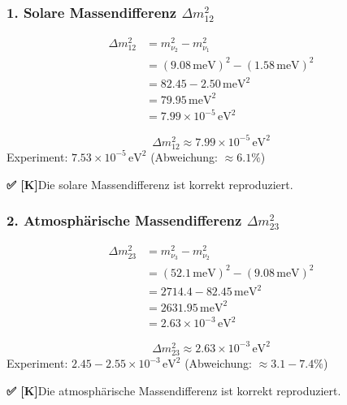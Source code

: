 \documentclass[11pt,a4paper]{article}
\newcommand{\Checkmark}{\textbf{✅ [K]}}
\begin{document}
	\subsubsection{1. Solare Massendifferenz $\Delta m_{12}^2$}
	
	\begin{align}
		\Delta m_{12}^2 &= m_{\nu_2}^2 - m_{\nu_1}^2 \\
		&= (9.08\,\text{meV})^2 - (1.58\,\text{meV})^2 \\
		&= 82.45 - 2.50 \,\text{meV}^2 \\
		&= 79.95 \,\text{meV}^2 \\
		&= 7.99 \times 10^{-5}\,\text{eV}^2
	\end{align}
	
	\begin{tcolorbox}[colback=green!5!white,colframe=green!50!black,title=Solare Massendifferenz -- GELÖST \Checkmark]
		\begin{equation}
			\Delta m_{12}^2 \approx 7.99 \times 10^{-5}\,\text{eV}^2
		\end{equation}
		Experiment: $7.53 \times 10^{-5}\,\text{eV}^2$ (Abweichung: $\approx 6.1\%$)
		
		\Checkmark Die solare Massendifferenz ist korrekt reproduziert.
	\end{tcolorbox}
	
	\subsubsection{2. Atmosphärische Massendifferenz $\Delta m_{23}^2$}
	
	\begin{align}
		\Delta m_{23}^2 &= m_{\nu_3}^2 - m_{\nu_2}^2 \\
		&= (52.1\,\text{meV})^2 - (9.08\,\text{meV})^2 \\
		&= 2714.4 - 82.45 \,\text{meV}^2 \\
		&= 2631.95 \,\text{meV}^2 \\
		&= 2.63 \times 10^{-3}\,\text{eV}^2
	\end{align}
	
	\begin{tcolorbox}[colback=green!5!white,colframe=green!50!black,title=Atmosphärische Massendifferenz -- GELÖST \Checkmark]
		\begin{equation}
			\Delta m_{23}^2 \approx 2.63 \times 10^{-3}\,\text{eV}^2
		\end{equation}
		Experiment: $2.45 - 2.55 \times 10^{-3}\,\text{eV}^2$ (Abweichung: $\approx 3.1 - 7.4\%$)
		
		\Checkmark Die atmosphärische Massendifferenz ist korrekt reproduziert.
	\end{tcolorbox}
	
\end{document}
